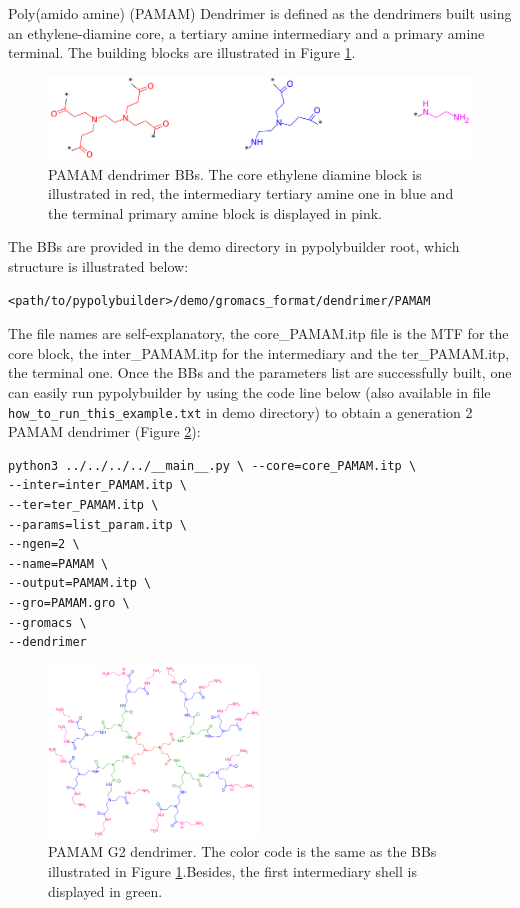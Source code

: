 
Poly(amido amine) (PAMAM) Dendrimer is defined as the dendrimers built using an ethylene-diamine core, a tertiary amine intermediary and a primary amine terminal.
The building blocks are illustrated in Figure \ref{fig:PAMAMBB}.

\begin{figure}
    \centering
    \includegraphics[width=\textwidth]{PAMAM/PAMAMBBs.png}
    \caption{PAMAM dendrimer BBs.
             The core ethylene diamine block is illustrated in red, the intermediary tertiary amine one in blue and the terminal primary amine block is displayed in pink.}
    \label{fig:PAMAMBB}
\end{figure}

The BBs are provided in the demo directory in pypolybuilder root, which structure is illustrated below:
\begin{lstlisting}
<path/to/pypolybuilder>/demo/gromacs_format/dendrimer/PAMAM
\end{lstlisting}

The file names are self-explanatory, the core\_PAMAM.itp file is the MTF for the core block, the inter\_PAMAM.itp for the intermediary and the ter\_PAMAM.itp, the terminal one.
Once the BBs and the parameters list are successfully built, one can easily run pypolybuilder by using the code line below (also available in file \texttt{how\_to\_run\_this\_example.txt} in demo directory) to obtain a generation 2 PAMAM dendrimer (Figure \ref{fig:PAMAMG2}):

\begin{lstlisting}
python3 ../../../../__main__.py \ --core=core_PAMAM.itp \
--inter=inter_PAMAM.itp \
--ter=ter_PAMAM.itp \
--params=list_param.itp \
--ngen=2 \
--name=PAMAM \
--output=PAMAM.itp \
--gro=PAMAM.gro \
--gromacs \
--dendrimer
\end{lstlisting}

\begin{figure}
    \centering
    \includegraphics[width=0.5\textwidth]{PAMAM/PAMAMG2.png}
    \caption{PAMAM G2 dendrimer. The color code is the same as the BBs illustrated in Figure \ref{fig:PAMAMBB}.Besides, the first intermediary shell is displayed in green.}
    \label{fig:PAMAMG2}
\end{figure}

